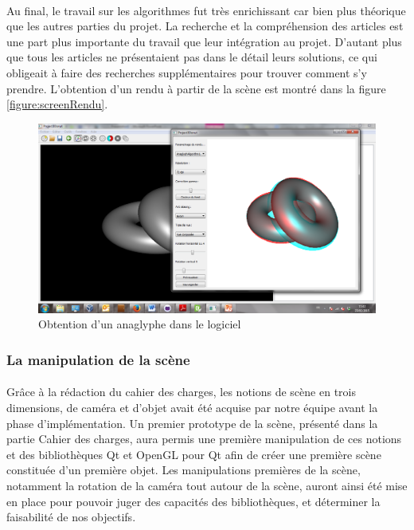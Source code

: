 \paragraph{}
Au final, le travail sur les algorithmes fut très enrichissant car bien plus théorique que les autres parties du projet. La recherche et la compréhension des articles est une part plus importante du travail que leur intégration au projet. D'autant plus que tous les articles ne présentaient pas dans le détail leurs solutions, ce qui obligeait à faire des recherches supplémentaires pour trouver comment s'y prendre. L'obtention d'un rendu à partir de la scène est montré dans la figure \ref{figure:screenRendu}.

\begin{figure}[h]
	\centering
	\includegraphics[scale=0.4]{rendu.png}
	\caption{\label{fig:screenRendu} Obtention d'un anaglyphe dans le logiciel \protect}
\end{figure}

\subsubsection{La manipulation de la scène}
\paragraph{}
Grâce à la rédaction du cahier des charges, les notions de scène en trois dimensions, de caméra et d'objet avait été acquise par notre équipe avant la phase d'implémentation. Un premier prototype de la scène, présenté dans la partie Cahier des charges, aura permis une première manipulation de ces notions et des bibliothèques Qt et OpenGL pour Qt afin de créer une première scène constituée d'un première objet. Les manipulations premières de la scène, notamment la rotation de la caméra tout autour de la scène, auront ainsi été mise en place pour pouvoir juger des capacités des bibliothèques, et déterminer la faisabilité de nos objectifs.

